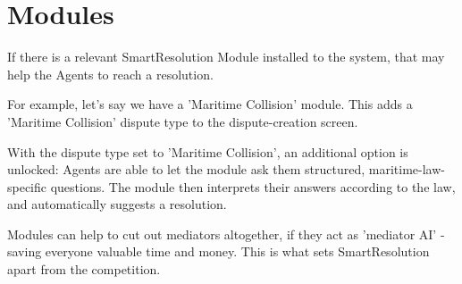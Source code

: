 \section{Modules}

If there is a relevant SmartResolution Module installed to the system, that may help the Agents to reach a resolution.

For example, let's say we have a 'Maritime Collision' module. This adds a 'Maritime Collision' dispute type to the dispute-creation screen.

With the dispute type set to 'Maritime Collision', an additional option is unlocked: Agents are able to let the module ask them structured, maritime-law-specific questions. The module then interprets their answers according to the law, and automatically suggests a resolution.

Modules can help to cut out mediators altogether, if they act as 'mediator AI' - saving everyone valuable time and money. This is what sets SmartResolution apart from the competition.